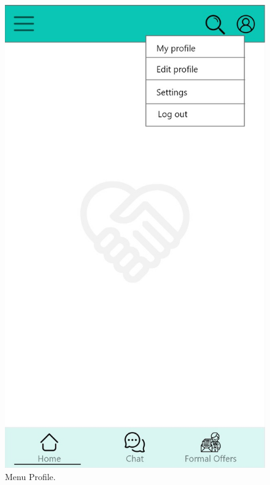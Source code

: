 \documentclass[./main.tex]{subfiles}
\begin{document}
\begin{figure}[H]
	\centering
	\includegraphics[width=0.5\linewidth]{img/menu-profile.jpeg}
	\caption{Menu Profile.}
	\label{fig:wire-8}
\end{figure}
\end{document}
